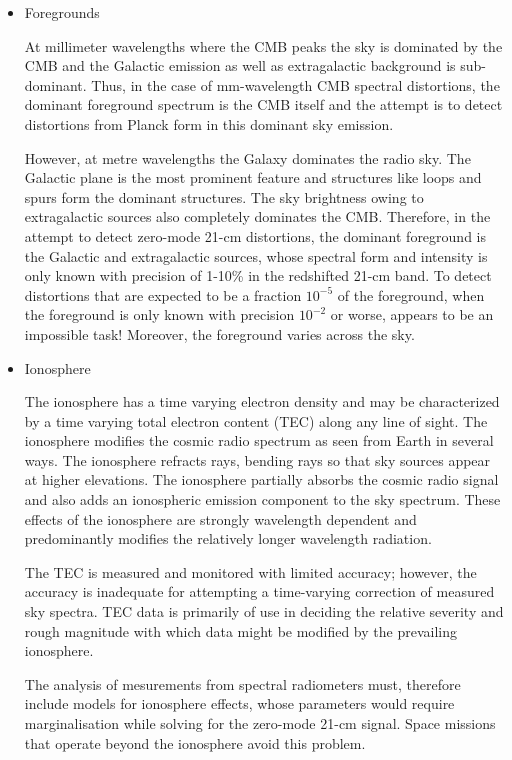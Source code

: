 \begin{itemize}

\item
Foregrounds

At millimeter wavelengths where the CMB peaks the sky is dominated by the CMB and the Galactic emission as well as extragalactic background is sub-dominant. Thus, in the case of mm-wavelength CMB spectral distortions, the dominant foreground spectrum is the CMB itself and the attempt is to detect distortions from Planck form in this dominant sky emission.

However, at metre wavelengths the Galaxy dominates the radio sky.  The Galactic plane is the most prominent feature and structures like loops and spurs form the dominant structures.  The sky brightness owing to extragalactic sources also completely dominates the CMB. Therefore, in the attempt to detect zero-mode 21-cm distortions, the dominant foreground is the Galactic and extragalactic sources, whose spectral form and intensity is only known with precision of 1-10\% in the redshifted 21-cm band.   To detect distortions that are expected to be a fraction $10^{-5}$ of the foreground, when the foreground is only known with precision $10^{-2}$ or worse, appears to be an impossible task!  Moreover, the foreground varies across the sky.

\item
Ionosphere

The ionosphere has a time varying electron density and may be characterized by a time varying total electron content (TEC) along any line of sight.  The ionosphere modifies the cosmic radio spectrum as seen from Earth in several ways. The ionosphere refracts rays, bending rays so that sky sources appear at higher elevations.  The ionosphere partially absorbs the cosmic radio signal and also adds an ionospheric emission component to the sky spectrum. These effects of the ionosphere are strongly wavelength dependent and predominantly modifies the relatively longer wavelength radiation.  

The TEC is measured and monitored with limited accuracy; however, the accuracy is inadequate for attempting a time-varying correction of measured sky spectra.  TEC data is primarily of use in deciding the relative severity and rough magnitude with which data might be modified by the prevailing ionosphere.  

The analysis of mesurements from spectral radiometers must, therefore include models for ionosphere effects, whose parameters would require marginalisation while solving for the zero-mode 21-cm signal.  Space missions that operate beyond the ionosphere avoid this problem.


\end{itemize}
